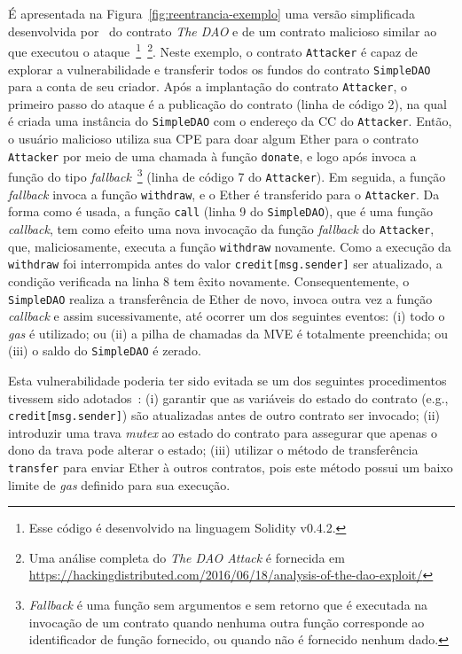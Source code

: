É apresentada na Figura~\ref{fig:reentrancia-exemplo} uma versão simplificada desenvolvida por~ do contrato \textit{The DAO} e de um contrato malicioso similar ao que executou o ataque~\footnote{Esse código é desenvolvido na linguagem Solidity v0.4.2.}~\footnote{Uma análise completa do \textit{The DAO Attack} é fornecida em \url{https://hackingdistributed.com/2016/06/18/analysis-of-the-dao-exploit/}}. Neste exemplo, o contrato \texttt{Attacker} é capaz de explorar a vulnerabilidade e transferir todos os fundos do contrato \texttt{SimpleDAO} para a conta de seu criador. Após a implantação do contrato \texttt{Attacker}, o primeiro passo do ataque é a publicação do contrato (linha de código 2), na qual é criada uma instância do \texttt{SimpleDAO} com o endereço da CC do \texttt{Attacker}. Então, o usuário malicioso utiliza sua CPE para doar algum Ether para o contrato \texttt{Attacker} por meio de uma chamada à função \texttt{donate}, e logo após invoca a função do tipo \textit{fallback}~\footnote{\textit{Fallback} é uma função sem argumentos e sem retorno que é executada na invocação de um contrato quando nenhuma outra função corresponde ao identificador de função fornecido, ou quando não é fornecido nenhum dado.} (linha de código 7 do \texttt{Attacker}). Em seguida, a função \textit{fallback} invoca a função \texttt{withdraw}, e o Ether é transferido para o \texttt{Attacker}. Da forma como é usada, a função \texttt{call} (linha 9 do \texttt{SimpleDAO}), que é uma função \textit{callback}, tem como efeito uma nova invocação da função \textit{fallback} do \texttt{Attacker}, que, maliciosamente, executa a função \texttt{withdraw} novamente. Como a execução da \texttt{withdraw} foi interrompida antes do valor \texttt{credit[msg.sender]} ser atualizado, a condição verificada na linha 8 tem êxito novamente. Consequentemente, o \texttt{SimpleDAO} realiza a transferência de Ether de novo, invoca outra vez a função \textit{callback} e assim sucessivamente, até ocorrer um dos seguintes eventos: (i) todo o \textit{gas} é utilizado; ou (ii) a pilha de chamadas da MVE é totalmente preenchida; ou (iii) o saldo do \texttt{SimpleDAO} é zerado.

Esta vulnerabilidade poderia ter sido evitada se um dos seguintes procedimentos tivessem sido adotados~\cite{consensys2021bestpractices}: (i) garantir que as variáveis do estado do contrato (e.g., \texttt{credit[msg.sender]}) são atualizadas antes de outro contrato ser invocado; (ii) introduzir uma trava \textit{mutex} ao estado do contrato para assegurar que apenas o dono da trava pode alterar o estado; (iii) utilizar o método de transferência \texttt{transfer} para enviar Ether à outros contratos, pois este método possui um baixo limite de \textit{gas} definido para sua execução. 

